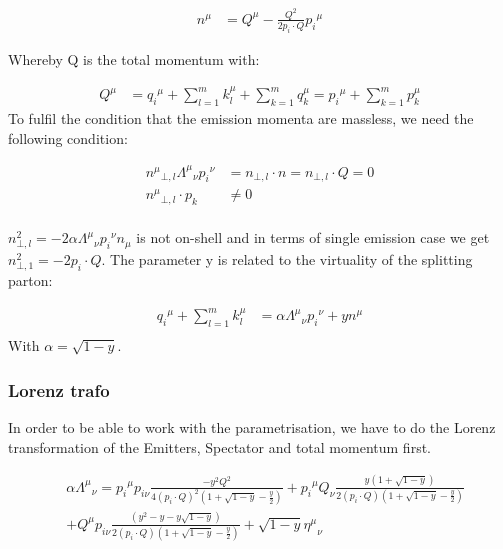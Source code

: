 \begin{equation}
\begin{split}
{n^{\mu}} &= Q^{\mu}-\frac{Q^2}{2p_i \cdot Q} {p_i}^{\mu}
\end{split}	
\end{equation}

Whereby Q is the total momentum with:

\begin{equation}
\begin{split}	
{Q}^{\mu} &= {q_i}^{\mu}+\displaystyle\sum\limits_{l=1}^m k_l^{\mu}+\displaystyle\sum\limits_{k=1}^m q_k^{\mu}={p_i}^{\mu}+\displaystyle\sum\limits_{k=1}^m p_k^{\mu}
\end{split}	
\end{equation}
To fulfil the condition that the emission momenta are massless, we need the following condition:

\begin{equation}
\begin{split}
	{n^{\mu}}_{\bot,l}{\Lambda^{\mu}}_{\nu}{p_i}^{\nu} &= {n_{\bot,l}} \cdot n = {n_{\bot,l}} \cdot Q =0\\
	{n^{\mu}}_{\bot,l}\cdot p_k &\neq0\\
\end{split}	
\end{equation}

$ {n}^2_{\bot,l} = -2\alpha{\Lambda^{\mu}}_{\nu}{p_i}^{\nu} n_{\mu} $ is not on-shell and in terms of single emission case we get $ {n}^2_{\bot,1} = -2p_i\cdot Q $.
The parameter y is related to the virtuality of the splitting parton:

\begin{equation}
\begin{split}
{q_i}^{\mu} +\displaystyle\sum\limits_{l=1}^m k_l^{\mu}   &= \alpha{\Lambda^{\mu}}_{\nu}{p_i}^{\nu} +y{n}^{\mu}\\
    \end{split}
\end{equation}
With $ \alpha = \sqrt{1-y} $.
\subsubsection*{Lorenz trafo}
In order to be able to work with the parametrisation, we have to do the Lorenz transformation of the Emitters, Spectator and total momentum first.

\begin{equation}
\begin{split}	
&\alpha{\Lambda^{\mu}}_{\nu} = {p_i}^{\mu} p_{i\nu} \frac{-y^2 Q^2}{4(p_i\cdot Q)^2(1+\sqrt{1-y}-\frac{y}{2})}
+{p_i}^{\mu} Q_{\nu} \frac{y(1+\sqrt{1-y})}{2(p_i\cdot Q)(1+\sqrt{1-y}-\frac{y}{2})}\\
&+{Q}^{\mu} p_{i\nu} \frac{(y^2 -y-y\sqrt{1-y})}{2(p_i\cdot Q)(1+\sqrt{1-y}-\frac{y}{2})}+\sqrt{1-y} {\eta^{\mu}}_{\nu}\\
\end{split}
\end{equation}

